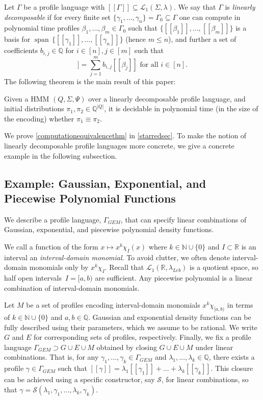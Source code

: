 \documentclass[a4paper,UKenglish,cleveref, autoref,mathscr, amsthm, thmtools, thm-restate]{lipics-v2019}
\newcommand{\RR}{\mathbb{R}}
\newcommand{\NN}{\mathbb{N}}
\newcommand{\QQ}{\mathbb{Q}}
\newcommand{\1}{\mathbb{I}}
\newcommand{\pl}{\Gamma_{\mathit{GEM}}}
\newcommand{\Leb}{\lambda_{\mathit{Leb}}}
\DeclareMathOperator{\Span}{span\,}
\begin{document}
Let $\Gamma$ be a profile language with $[\![\Gamma]\!] \subseteq \mathcal{L}_1(\Sigma, \lambda)$. We say that $\Gamma$ is \emph{linearly decomposable} if for every finite set $\{\gamma_1, \dots, \gamma_n\} = \Gamma_0 \subseteq \Gamma$ one can compute in polynomial time profiles $\beta_1, \dots, \beta_m \in \Gamma_0$ such that $\{[\![\beta_1]\!], \dots, [\![\beta_m]\!]\}$ is a basis for $\Span \{[\![\gamma_1]\!], \dots, [\![\gamma_n]\!]\}$ (hence $m \leq n$), and further a set of coefficients $b_{i,j} \in \QQ$ for $i \in [n], j \in [m]$ such that
\begin{equation*}
[\![\gamma_i]\!] = \sum_{j = 1}^m b_{i,j}[\![\beta_j]\!] \text{ for all $i \in [n]$.}
\end{equation*}
The following theorem is the main result of this paper:
\begin{theorem}\label{computationequivalencethm}
Given a HMM $(Q, \Sigma, \Psi)$ over a linearly decomposable profile language, and initial distributions $\pi_1, \pi_2 \in \QQ^{|Q|}$, it is decidable in polynomial time (in the size of the encoding) whether $\pi_1 \equiv \pi_2$.
\end{theorem}
We prove \cref{computationequivalencethm} in \cref{starredsec}.
To make the notion of linearly decomposable profile languages more concrete, we give a concrete example in the following subsection.

\subsection{Example: Gaussian, Exponential, and Piecewise Polynomial Functions} \label{sub-profile-example}

We describe a profile language, $\pl$, that can specify linear combinations of Gaussian, exponential, and piecewise polynomial density functions.

We call a function of the form $x \mapsto x^k \chi_{I}(x)$ where $k \in \NN \cup \{0\}$ and $I \subset \RR$ is an interval an \emph{interval-domain monomial}.
To avoid clutter, we often denote interval-domain monomials only by $x^k \chi_I$.
Recall that $\mathcal{L}_1(\RR, \Leb)$ is a quotient space, so half open intervals~$I = [a,b)$ are sufficient. Any piecewise polynomial is a linear combination of interval-domain monomials.

Let $M$ be a set of profiles encoding interval-domain monomials $x^k \chi_{[a,b)}$ in terms of $k \in \NN \cup \{0\}$ and $a,b \in \QQ$. Gaussian and exponential density functions can be fully described using their parameters, which we assume to be rational. We write $G$ and $E$ for corresponding sets of profiles, respectively.
%
Finally, we fix a profile language $\pl \supset G \cup E \cup M$ obtained by closing $G \cup E \cup M$ under linear combinations. That is, for any $\gamma_1, \dots, \gamma_k \in \pl$ and $\lambda_1, \dots, \lambda_k \in \QQ$, there exists a profile $\gamma \in \pl$ such that $[\![\gamma]\!] = \lambda_1 [\![\gamma_1]\!] + \dots + \lambda_k [\![\gamma_k]\!]$.
This closure can be achieved using a specific constructor, say $\mathcal{S}$, for linear combinations, so that $\gamma = \mathcal{S}(\lambda_1, \gamma_1, \ldots, \lambda_k, \gamma_k)$.
\end{document}

